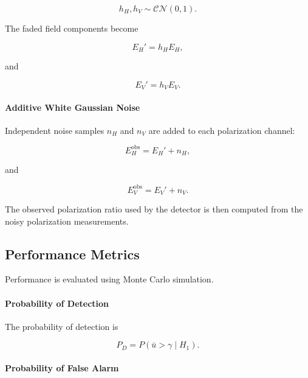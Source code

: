 \documentclass{article}
\begin{document}
\begin{equation}
h_H,h_V
\sim
\mathcal{CN}(0,1).
\end{equation}

The faded field components become

\begin{equation}
E_H'=
h_H E_H,
\end{equation}

and

\begin{equation}
E_V'=
h_V E_V.
\end{equation}

\paragraph{Additive White Gaussian Noise}

Independent noise samples $n_H$ and $n_V$ are added to each polarization channel:

\begin{equation}
E_H^{\mathrm{obs}}=
E_H'+n_H,
\end{equation}

and

\begin{equation}
E_V^{\mathrm{obs}}=
E_V'+n_V.
\end{equation}

The observed polarization ratio used by the detector is then computed from the noisy polarization measurements.

\subsection{Performance Metrics}

Performance is evaluated using Monte Carlo simulation.

\paragraph{Probability of Detection}

The probability of detection is

\begin{equation}
P_D=
P(\bar{u}>\gamma \mid H_1).
\end{equation}

\paragraph{Probability of False Alarm}
\end{document}
